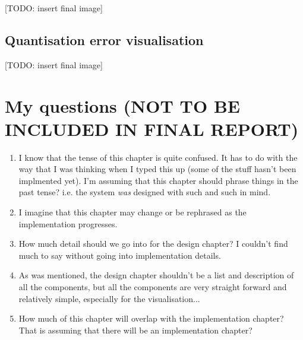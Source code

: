 [TODO: insert final image]


\subsection{Quantisation error visualisation}
\label{sub:design_quanterror}

[TODO: insert final image]





\newpage
\section{My questions (NOT TO BE INCLUDED IN FINAL REPORT)}

\begin{enumerate}

  \item
  I know that the tense of this chapter is quite confused. It has to do with
  the way that I was thinking when I typed this up (some of the stuff hasn't
  been implmented yet). I'm assuming that this chapter should phrase things in
  the past tense? i.e. the system \emph{was} designed with such and such in
  mind.

  \item
  I imagine that this chapter may change or be rephrased as the implementation
  progresses.

  \item
  How much detail should we go into for the design chapter? I couldn't find
  much to say without going into implementation details.

  \item
  As was mentioned, the design chapter shouldn't be a list and description of
  all the components, but all the components are very straight forward and
  relatively simple, especially for the visualisation...

  \item
  How much of this chapter will overlap with the implementation chapter?
  That is assuming that there will be an implementation chapter?

\end{enumerate}

